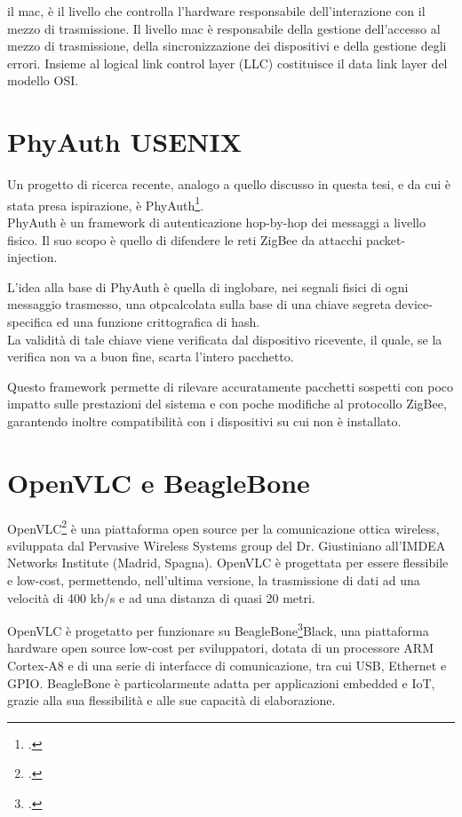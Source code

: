 il \gls{mac}, è il livello che controlla l'hardware responsabile dell'interazione con il mezzo di trasmissione. Il livello \gls{mac} è responsabile della gestione dell'accesso al mezzo di trasmissione, della sincronizzazione dei dispositivi e della gestione degli errori. Insieme al logical link control layer (LLC) costituisce il data link layer del modello OSI.

\section{PhyAuth USENIX}
Un progetto di ricerca recente, analogo a quello discusso in questa tesi, e da cui è stata presa ispirazione, è PhyAuth\footcite{phyauth2023}.\\
PhyAuth è un framework di autenticazione hop-by-hop dei messaggi a livello fisico. Il suo scopo è quello di difendere le reti ZigBee da attacchi packet-injection.

L'idea alla base di PhyAuth è quella di inglobare, nei segnali fisici di ogni messaggio trasmesso, una \gls{otp}\glsfirstoccur calcolata sulla base di una chiave segreta device-specifica ed una funzione crittografica di hash.\\
La validità di tale chiave viene verificata dal dispositivo ricevente, il quale, se la verifica non va a buon fine, scarta l'intero pacchetto.

Questo framework permette di rilevare accuratamente pacchetti sospetti con poco impatto sulle prestazioni del sistema e con poche modifiche al protocollo ZigBee, garantendo inoltre compatibilità con i dispositivi su cui non è installato.

\section{OpenVLC e BeagleBone}
OpenVLC\footcite{site:openvlc} è una piattaforma open source per la comunicazione ottica wireless, sviluppata dal Pervasive Wireless Systems group del Dr. Giustiniano all'IMDEA Networks Institute (Madrid, Spagna).
OpenVLC è progettata per essere flessibile e low-cost, permettendo, nell'ultima versione, la trasmissione di dati ad una velocità di 400 kb/s e ad una distanza di quasi 20 metri.

OpenVLC è progetatto per funzionare su BeagleBone\footcite{site:beaglebone}Black, una piattaforma hardware open source low-cost per sviluppatori, dotata di un processore ARM Cortex-A8 e di una serie di interfacce di comunicazione, tra cui USB, Ethernet e GPIO. BeagleBone è particolarmente adatta per applicazioni embedded e IoT, grazie alla sua flessibilità e alle sue capacità di elaborazione.

